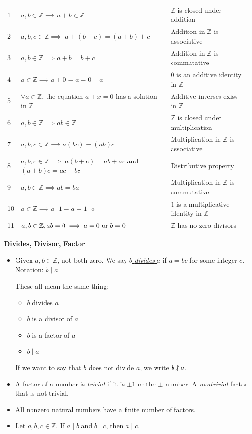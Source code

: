\documentclass[11pt]{article}
\newcommand\tn{\textnormal}
\newcommand{\Z}{\mathbb{Z}}
\newcommand\divides{\;|\;}
\newcommand\notdivides{\hspace*{-2pt}\not |\;}
\theoremstyle{definition}
\begin{document}
\begin{tabular}{C{0.2in}|L{3.5in}|L{2.25in}}
1 & $a,b \in \Z \implies a+b\in \Z$ &  $\Z$ is closed under addition \\ 
2 & $a,b,c\in \Z\implies$ $a+(b+c)=(a+b)+c$ & Addition in $\Z$ is associative \\
3 & $a,b \in \Z \implies a+b=b+a$&  Addition in $\Z$ is commutative \\ 
4 & $a\in \Z \implies a+0=a=0+a$ & $0$ is an additive identity in $\Z$ \\ 
5 & $\forall a\in \Z$, the equation $a+x=0$ has a solution in $\Z$ & Additive inverses exist in $\Z$ \\ 
6 & $a,b\in\Z \implies ab\in \Z$ & $\Z$ is closed under multiplication \\ 
7 & $a,b,c\in \Z \implies a(bc)=(ab)c$ & Multiplication in $\Z$ is associative \\ 
8 & $a,b,c\in \Z\implies$  $a(b+c)=ab+ac$ and $(a+b)c=ac+bc$& Distributive property \\
9 & $a,b\in \Z\implies ab=ba$ & Multiplication in $\Z$ is commutative \\  
10 &$a\in\Z\implies a\cdot 1=a=1\cdot a$ & $1$ is a multiplicative identity in $\Z$ \\ 
11 & $a,b\in \Z, ab=0 \implies a=0 \tn { or } b=0$ & $\Z$ has no zero divisors
\end{tabular} 

\vspace*{4pt}
{\bf Divides, Divisor, Factor} 

\vspace*{-8pt}
\begin{itemize}
\item  Given $a, b\in \Z$, not both zero. We say \underline{$b$ {\it divides} $a$}  if $a=bc$ for some integer $c$.   Notation: $b\divides a$
		 
		 These all mean the same thing:
		\begin{itemize}[label={$\circ$}]
		\item $b$ divides $a$
		\item $b$ is a divisor of $a$
		\item $b$ is a factor of $a$
		\item $b\divides a$
		\end{itemize}
		
		 If we want to say that $b$ does not divide $a$, we write $b\notdivides a$.

\item A factor of a number is \underline {\it trivial} if it is $\pm 1$ or the $\pm$ number.  A \underline{\it nontrivial} factor that is not trivial.

\item All nonzero natural numbers have a finite number of factors.

\item Let $a,b,c\in \Z$. If $a\divides b$ and $b\divides c$, then $a\divides c$.
\end{itemize}
\end{document}
